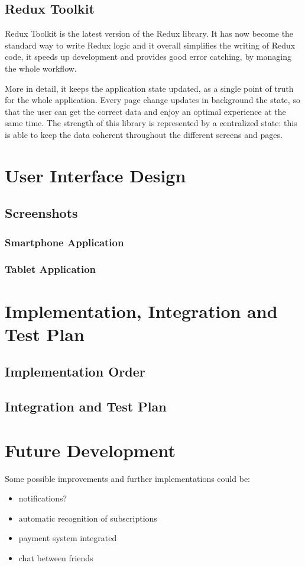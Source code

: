 \documentclass[11pt]{article}
\begin{document}
\subsection{Redux Toolkit}
Redux Toolkit is the latest version of the Redux library. It has now become the standard way to write Redux logic and it overall simplifies the writing of Redux code, it speeds up development and provides good error catching, by managing the whole workflow.

More in detail, it keeps the application state updated, as a single point of truth for the whole application. Every page change updates in background the state, so that the user can get the correct data and enjoy an optimal experience at the same time. The strength of this library is represented by a centralized state: this is able to keep the data coherent throughout the different screens and pages.


\newpage
\section{User Interface Design}\label{sec:ui}

\subsection{Screenshots}
\subsubsection{Smartphone Application}

\subsubsection{Tablet Application}

\newpage
\section{Implementation, Integration and Test Plan}\label{sec:test}
\subsection{Implementation Order}

\subsection{Integration and Test Plan}

\newpage
\section{Future Development}\label{sec:dev}
Some possible improvements and further implementations could be:
\begin{itemize}
    \item notifications?
    \item automatic recognition of subscriptions
    \item payment system integrated
    \item chat between friends
\end{itemize}
\end{document}
